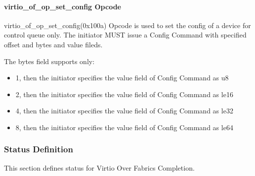 \paragraph{virtio_of_op_set_config Opcode}\label{sec:Virtio Transport Options / Virtio Over Fabrics / Transmition Protocol / Opcodes Definition / virtio_of_op_set_config Opcode}

virtio_of_op_set_config(0x100a) Opcode is used to set the config of a device for control queue only. The initiator MUST issue a Config Command with specified offset and bytes and value fileds.

The bytes field supports only:

\begin{itemize}
\item 1, then the initiator specifies the value field of Config Command as u8
\item 2, then the initiator specifies the value field of Config Command as le16
\item 4, then the initiator specifies the value field of Config Command as le32
\item 8, then the initiator specifies the value field of Config Command as le64
\end{itemize}

\subsubsection{Status Definition}\label{sec:Virtio Transport Options / Virtio Over Fabrics / Transmition Protocol / Status Definition}
This section defines status for Virtio Over Fabrics Completion.

